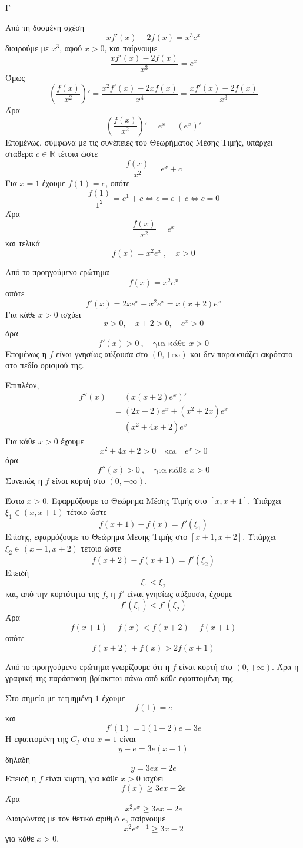 \begin{thema}{Γ}
\begin{erwthma}
\item Από τη δοσμένη σχέση
\[
xf'(x)-2f(x)=x^3e^x
\]
διαιρούμε με $x^3$, αφού $x>0$, και παίρνουμε
\[
\frac{xf'(x)-2f(x)}{x^3}=e^x
\]
Όμως
\[
\left(\frac{f(x)}{x^2}\right)'
=\frac{x^2f'(x)-2xf(x)}{x^4}
=\frac{xf'(x)-2f(x)}{x^3}
\]
Άρα
\[
\left(\frac{f(x)}{x^2}\right)'=e^x=(e^x)'
\]
Επομένως, σύμφωνα με τις συνέπειες του Θεωρήματος Μέσης Τιμής, υπάρχει σταθερά $c\in\mathbb{R}$ τέτοια ώστε
\[
\frac{f(x)}{x^2}=e^x+c
\]
Για $x=1$ έχουμε $f(1)=e$, οπότε
\[
\frac{f(1)}{1^2}=e^1+c\Leftrightarrow e=e+c\Leftrightarrow c=0
\]
Άρα
\[
\frac{f(x)}{x^2}=e^x
\]
και τελικά
\[
f(x)=x^2e^x\ ,\quad x>0
\]

\item Από το προηγούμενο ερώτημα
\[
f(x)=x^2e^x
\]
οπότε
\[
f'(x)=2xe^x+x^2e^x=x(x+2)e^x
\]
Για κάθε $x>0$ ισχύει
\[
x>0,\quad x+2>0,\quad e^x>0
\]
άρα
\[
f'(x)>0\ ,\quad \text{για κάθε }x>0
\]
Επομένως η $f$ είναι γνησίως αύξουσα στο $(0,+\infty)$ και δεν παρουσιάζει ακρότατο στο πεδίο ορισμού της.

Επιπλέον,
\begin{align*}
f''(x)
&=\left(x(x+2)e^x\right)'\\
&=(2x+2)e^x+(x^2+2x)e^x\\
&=(x^2+4x+2)e^x
\end{align*}
Για κάθε $x>0$ έχουμε
\[
x^2+4x+2>0
\quad \text{και}\quad
e^x>0
\]
άρα
\[
f''(x)>0\ ,\quad \text{για κάθε }x>0
\]
Συνεπώς η $f$ είναι κυρτή στο $(0,+\infty)$.

\item Έστω $x>0$.
Εφαρμόζουμε το Θεώρημα Μέσης Τιμής στο $[x,x+1]$.
Υπάρχει $\xi_1\in(x,x+1)$ τέτοιο ώστε
\[
f(x+1)-f(x)=f'(\xi_1)
\]
Επίσης, εφαρμόζουμε το Θεώρημα Μέσης Τιμής στο $[x+1,x+2]$.
Υπάρχει $\xi_2\in(x+1,x+2)$ τέτοιο ώστε
\[
f(x+2)-f(x+1)=f'(\xi_2)
\]
Επειδή
\[
\xi_1<\xi_2
\]
και, από την κυρτότητα της $f$, η $f'$ είναι γνησίως αύξουσα, έχουμε
\[
f'(\xi_1)<f'(\xi_2)
\]
Άρα
\[
f(x+1)-f(x)<f(x+2)-f(x+1)
\]
οπότε
\[
f(x+2)+f(x)>2f(x+1)
\]

\item Από το προηγούμενο ερώτημα γνωρίζουμε ότι η $f$ είναι κυρτή στο $(0,+\infty)$.
Άρα η γραφική της παράσταση βρίσκεται πάνω από κάθε εφαπτομένη της.

Στο σημείο με τετμημένη $1$ έχουμε
\[
f(1)=e
\]
και
\[
f'(1)=1(1+2)e=3e
\]
Η εφαπτομένη της $C_f$ στο $x=1$ είναι
\[
y-e=3e(x-1)
\]
δηλαδή
\[
y=3ex-2e
\]
Επειδή η $f$ είναι κυρτή, για κάθε $x>0$ ισχύει
\[
f(x)\geq 3ex-2e
\]
Άρα
\[
x^2e^x\geq 3ex-2e
\]
Διαιρώντας με τον θετικό αριθμό $e$, παίρνουμε
\[
x^2e^{x-1}\geq 3x-2
\]
για κάθε $x>0$.
\end{erwthma}
\end{thema}

